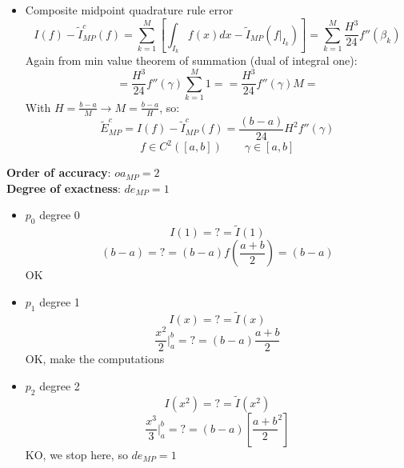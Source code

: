 \begin{itemize}
\begin{itemize}
        \item Composite midpoint quadrature rule error
        $$
        I(f)-\tilde{I}_{MP}^c(f)=\sum_{k=1}^M\left[
            \int_{I_k}f(x)dx-
            \tilde{I}_{MP}\left(f\big|_{I_k}\right)
        \right]=
        \sum_{k=1}^M\frac{H^3}{24}f''(\beta_k)
        $$
        Again from min value theorem of summation (dual of integral one):
        $$
        =\frac{H^3}{24}f''(\gamma)\sum_{k=1}^M1=
        =\frac{H^3}{24}f''(\gamma)M=
        $$
        With $H=\frac{b-a}{M}\rightarrow M=\frac{b-a}{H}$, so:
        $$
        \tilde{E}_{MP}^c=I(f)-\tilde{I}_{MP}^c(f)=
        \frac{(b-a)}{24}H^2f''(\gamma)
        $$
        $$
        f\in C^2([a,b])\qquad\gamma\in[a,b]
        $$
    \end{itemize}
    \textbf{Order of accuracy}: $oa_{MP}=2$\\
    \textbf{Degree of exactness}: $de_{MP}=1$
    \begin{itemize}
        \item $p_0$ degree 0
        $$I(1)=?=\tilde{I}(1)$$
        $$
        (b-a)=?=(b-a)f\left(\frac{a+b}{2}\right)=(b-a)
        $$
        OK
        \item $p_1$ degree 1
        $$I(x)=?=\tilde{I}(x)$$
        $$
        \frac{x^2}{2}\Big|_a^b=?=(b-a)\frac{a+b}{2}
        $$
        OK, make the computations
        \item $p_2$ degree 2
        $$I(x^2)=?=\tilde{I}(x^2)$$
        $$
        \frac{x^3}{3}\Big|_a^b=?=(b-a)\left[\frac{a+b}{2}^2\right]
        $$
        KO, we stop here, so $de_{MP}=1$
    \end{itemize}


\end{itemize}
